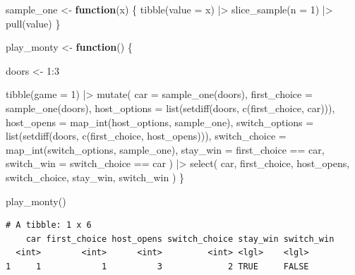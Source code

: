 \documentclass[
  letterpaper,
  DIV=11,
  numbers=noendperiod]{scrreprt}
\newenvironment{Shaded}{\begin{snugshade}}{\end{snugshade}}
\newcommand{\AttributeTok}[1]{\textcolor[rgb]{0.40,0.45,0.13}{#1}}
\newcommand{\ControlFlowTok}[1]{\textcolor[rgb]{0.00,0.23,0.31}{\textbf{#1}}}
\newcommand{\DecValTok}[1]{\textcolor[rgb]{0.68,0.00,0.00}{#1}}
\newcommand{\FunctionTok}[1]{\textcolor[rgb]{0.28,0.35,0.67}{#1}}
\newcommand{\NormalTok}[1]{\textcolor[rgb]{0.00,0.23,0.31}{#1}}
\newcommand{\OtherTok}[1]{\textcolor[rgb]{0.00,0.23,0.31}{#1}}
\newcommand{\SpecialCharTok}[1]{\textcolor[rgb]{0.37,0.37,0.37}{#1}}
\begin{document}
\begin{Shaded}
\begin{Highlighting}[]
\NormalTok{sample\_one }\OtherTok{\textless{}{-}} \ControlFlowTok{function}\NormalTok{(x) \{}
  \FunctionTok{tibble}\NormalTok{(}\AttributeTok{value =}\NormalTok{ x) }\SpecialCharTok{|\textgreater{}}
    \FunctionTok{slice\_sample}\NormalTok{(}\AttributeTok{n =} \DecValTok{1}\NormalTok{) }\SpecialCharTok{|\textgreater{}}
    \FunctionTok{pull}\NormalTok{(value)}
\NormalTok{\}}

\NormalTok{play\_monty }\OtherTok{\textless{}{-}} \ControlFlowTok{function}\NormalTok{() \{}
  
\NormalTok{  doors }\OtherTok{\textless{}{-}} \DecValTok{1}\SpecialCharTok{:}\DecValTok{3}
  
  \FunctionTok{tibble}\NormalTok{(}\AttributeTok{game =} \DecValTok{1}\NormalTok{) }\SpecialCharTok{|\textgreater{}}
    \FunctionTok{mutate}\NormalTok{(}
      \AttributeTok{car =} \FunctionTok{sample\_one}\NormalTok{(doors),}
      \AttributeTok{first\_choice =} \FunctionTok{sample\_one}\NormalTok{(doors),}
      \AttributeTok{host\_options =} \FunctionTok{list}\NormalTok{(}\FunctionTok{setdiff}\NormalTok{(doors, }\FunctionTok{c}\NormalTok{(first\_choice, car))),}
      \AttributeTok{host\_opens =} \FunctionTok{map\_int}\NormalTok{(host\_options, sample\_one),}
      \AttributeTok{switch\_options =} \FunctionTok{list}\NormalTok{(}\FunctionTok{setdiff}\NormalTok{(doors, }\FunctionTok{c}\NormalTok{(first\_choice, host\_opens))),}
      \AttributeTok{switch\_choice =} \FunctionTok{map\_int}\NormalTok{(switch\_options, sample\_one),}
      \AttributeTok{stay\_win =}\NormalTok{ first\_choice }\SpecialCharTok{==}\NormalTok{ car,}
      \AttributeTok{switch\_win =}\NormalTok{ switch\_choice }\SpecialCharTok{==}\NormalTok{ car}
\NormalTok{    ) }\SpecialCharTok{|\textgreater{}}
    \FunctionTok{select}\NormalTok{(}
\NormalTok{      car,}
\NormalTok{      first\_choice,}
\NormalTok{      host\_opens,}
\NormalTok{      switch\_choice,}
\NormalTok{      stay\_win,}
\NormalTok{      switch\_win}
\NormalTok{    )}
\NormalTok{\}}

\FunctionTok{play\_monty}\NormalTok{()}
\end{Highlighting}
\end{Shaded}

\begin{verbatim}
# A tibble: 1 x 6
    car first_choice host_opens switch_choice stay_win switch_win
  <int>        <int>      <int>         <int> <lgl>    <lgl>     
1     1            1          3             2 TRUE     FALSE     
\end{verbatim}
\end{document}
